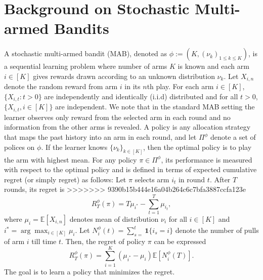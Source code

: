 \documentclass{article}
\begin{document}
\section{Background on Stochastic Multi-armed Bandits}
A stochastic multi-armed bandit (MAB), denoted as $\phi:=(K, (\nu_k)_{1 \leq k \leq K})$, is a sequential learning problem where number of arms $K$ is known and each arm $i \in [K]$ gives rewards drawn according to an unknown distribution $\nu_k$. Let $X_{i,n}$ denote the random reward from arm $i$ in its $n$th play. For each arm $i\in [K]$, $\{X_{i,t}: t>0\}$ are independently and identically (i.i.d) distributed and for all $t>0$, $\{X_{i,t}, i \in [K]\}$ are independent. We note that in the standard MAB setting the learner observes only reward from the selected arm in each round and no information from the other arms is revealed. A policy is any allocation strategy that maps the past history into an arm in each round, and let $\Pi^\phi$ denote a set of polices on $\phi$. If the learner knows $\{\nu_k\}_{k \in [K]}$, then the optimal policy is to play the arm with highest mean. For any policy $\pi \in \Pi^\phi$, its performance is measured with respect to the optimal policy and is defined in terms of expected cumulative regret (or simply regret) as follows:  Let $\pi$ selects arm $i_t$ in round $t$. After $T$ rounds, its regret is 
>>>>>>> 9390b15b444e16a04b264c6c7bfa3887ccfa123e
\begin{equation}
\label{eqn:BanditRegret}
R^\phi_T(\pi)= T \mu_{i^*}- \sum_{t=1}^{T}\mu_{i_t},
\end{equation} 
where $\mu_i=\mathbb{E}[X_{i,n}]$ denotes mean of distribution  $\nu_i$ for all $i\in [K]$ and  $i^*= \arg\max_{i \in [K]} \mu_i$. Let $N^\phi_i(t)=\sum_{s=}^{t}\boldsymbol{1}\{i_s=i\}$ denote the number of pulls of arm $i$ till time $t$. Then, the regret of policy $\pi$ can be expressed 
\[R^\phi_T(\pi)=\sum_{i=1}^{K}(\mu_{i^*}-\mu_i)\mathbb{E}[N^\phi_i(T)].\]
The goal is to learn a policy that minimizes the regret.  
\end{document}
